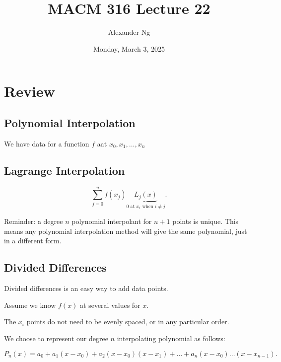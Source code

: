 \documentclass[12pt]{article}
\begin{document}
\title{MACM 316 Lecture 22}
\author{Alexander Ng}
\date{Monday, March 3, 2025}

\maketitle

\section{Review}

\subsection{Polynomial Interpolation}
We have data for a function $f$ aat $x_0, x_1, \dots, x_n$

\subsection{Lagrange Interpolation}
\[
  \sum_{j=0}^n f(x_j) \underbrace{L_j(x)}_{0 \text{ at } x_i \text{ when } i \neq j}
.\]

Reminder: a degree $n$ polynomial interpolant for $n+1$ points is unique. This
means any polynomial interpolation method will give the same polynomial, just in
a different form.

\subsection{Divided Differences}

Divided differences is an easy way to add data points.

Assume we know $f(x)$ at several values for $x$.


The $x_i$ points do \uline{not} need to be evenly spaced, or in any particular order.

We choose to represent our degree $n$ interpolating polynomial as follows:

\[
  P_n(x) = a_0 + a_1 (x-x_0) + a_2 (x-x_0) (x-x_1) + \dots + a_n (x-x_0) \dots (x-x_{n-1})
.\]
\end{document}
